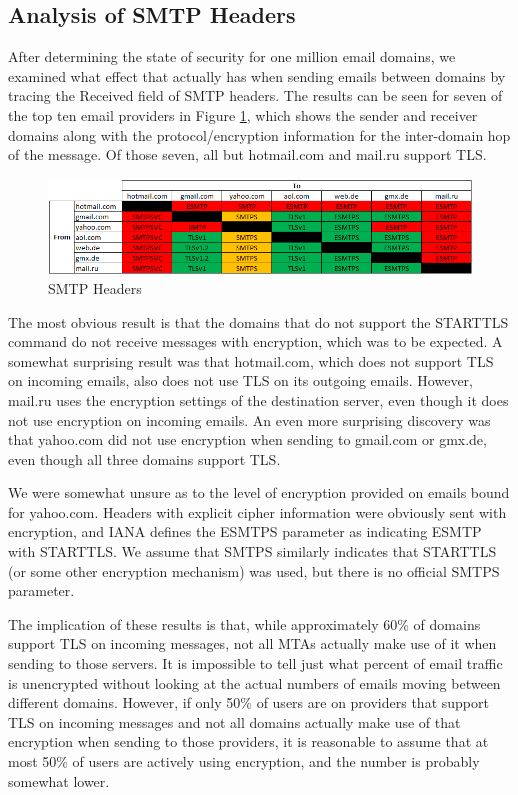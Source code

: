 \subsection{Analysis of SMTP Headers}
After determining the state of security for one million email domains, we 
examined what effect that actually has when sending emails between domains by 
tracing the Received field of SMTP headers.  The results can be seen for seven 
of the top ten email providers in Figure \ref{email_analysis}, which shows the sender and 
receiver domains along with the protocol/encryption information for the 
inter-domain hop of the message.  Of those seven, all but hotmail.com and 
mail.ru support TLS.

\begin{figure}
    \includegraphics[width=6.0in]{images/email_analysis.png}
    \caption{SMTP Headers}
    \label{email_analysis}
\end{figure}

The most obvious result is that the domains that do not support the STARTTLS 
command do not receive messages with encryption, which was to be expected.  A 
somewhat surprising result was that hotmail.com, which does not support TLS on 
incoming emails, also does not use TLS on its outgoing emails.  However, mail.ru 
uses the encryption settings of the destination server, even though it does not 
use encryption on incoming emails.  An even more surprising discovery was that 
yahoo.com did not use encryption when sending to gmail.com or gmx.de, even 
though all three domains support TLS.

We were somewhat unsure as to the level of encryption provided on emails bound 
for yahoo.com.  Headers with explicit cipher information were obviously sent 
with encryption, and IANA defines the ESMTPS parameter as indicating ESMTP 
with STARTTLS\cite{mail}. We assume that SMTPS similarly indicates that STARTTLS (or some other 
encryption mechanism) was used, but there is no official SMTPS parameter.

The implication of these results is that, while approximately 60\% of domains 
support TLS on incoming messages, not all MTAs actually make use of it when 
sending to those servers.  It is impossible to tell just what percent of 
email traffic is unencrypted without looking at the actual numbers of emails 
moving between different domains.  However, if only 50\% of users are on 
providers that support TLS on incoming messages and not all domains actually 
make use of that encryption when sending to those providers, it is 
reasonable to assume that at most 50\% of users are actively using 
encryption, and the number is probably somewhat lower.

